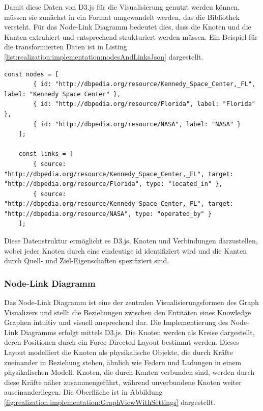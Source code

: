 Damit diese Daten von D3.js für die Visualisierung genutzt werden können, müssen sie zunächst in ein Format umgewandelt werden, das die Bibliothek versteht. Für das Node-Link Diagramm bedeutet dies, dass die Knoten und die Kanten extrahiert und entsprechend strukturiert werden müssen. Ein Beispiel für die transformierten Daten ist in Listing \ref{list:realization:implementation:nodesAndLinksJson} dargestellt.

\begin{lstlisting}[caption={Informationen einer Node im JSON Format.}, label={list:realization:implementation:nodesAndLinksJson}]
    const nodes = [
        { id: "http://dbpedia.org/resource/Kennedy_Space_Center,_FL", label: "Kennedy Space Center" },
        { id: "http://dbpedia.org/resource/Florida", label: "Florida" },
        { id: "http://dbpedia.org/resource/NASA", label: "NASA" }
    ];
    
    const links = [
        { source: "http://dbpedia.org/resource/Kennedy_Space_Center,_FL", target: "http://dbpedia.org/resource/Florida", type: "located_in" },
        { source: "http://dbpedia.org/resource/Kennedy_Space_Center,_FL", target: "http://dbpedia.org/resource/NASA", type: "operated_by" }
    ];
\end{lstlisting}

Diese Datenstruktur ermöglicht es D3.js, Knoten und Verbindungen darzustellen, wobei jeder Knoten durch eine eindeutige id identifiziert wird und die Kanten durch Quell- und Ziel-Eigenschaften spezifiziert sind.

\subsubsection{Node-Link Diagramm}

Das Node-Link Diagramm ist eine der zentralen Visualisierungsformen des Graph Visualizers und stellt die Beziehungen zwischen den Entitäten eines Knowledge Graphen intuitiv und visuell ansprechend dar. Die Implementierung des Node-Link Diagramms erfolgt mittels D3.js. Die Knoten werden als Kreise dargestellt, deren Positionen durch ein Force-Directed Layout bestimmt werden. Dieses Layout modelliert die Knoten als physikalische Objekte, die durch Kräfte zueinander in Beziehung stehen, ähnlich wie Federn und Ladungen in einem physikalischen Modell. Knoten, die durch Kanten verbunden sind, werden durch diese Kräfte näher zusammengeführt, während unverbundene Knoten weiter auseinanderliegen. Die Oberfläche ist in Abbildung \ref{fig:realization:implementation:GraphViewWithSettings} dargestellt.

